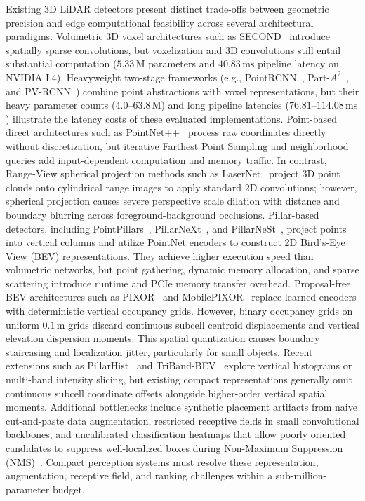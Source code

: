 Existing 3D LiDAR detectors present distinct trade-offs between geometric precision and edge computational feasibility across several architectural paradigms. Volumetric 3D voxel architectures such as SECOND~\cite{yan2018second} introduce spatially sparse convolutions, but voxelization and 3D convolutions still entail substantial computation ($5.33\,\text{M}$ parameters and $40.83\,\text{ms}$ pipeline latency on NVIDIA L4). Heavyweight two-stage frameworks (e.g., PointRCNN~\cite{shi2019pointrcnn}, Part-$A^2$~\cite{shi2020part}, and PV-RCNN~\cite{shi2020pvrcnn}) combine point abstractions with voxel representations, but their heavy parameter counts ($4.0\text{--}63.8\,\text{M}$) and long pipeline latencies ($76.81\text{--}114.08\,\text{ms}$) illustrate the latency costs of these evaluated implementations. Point-based direct architectures such as PointNet++~\cite{qi2017pointnetplusplus} process raw coordinates directly without discretization, but iterative Farthest Point Sampling and neighborhood queries add input-dependent computation and memory traffic. In contrast, Range-View spherical projection methods such as LaserNet~\cite{meyer2019lasernet} project 3D point clouds onto cylindrical range images to apply standard 2D convolutions; however, spherical projection causes severe perspective scale dilation with distance and boundary blurring across foreground-background occlusions. Pillar-based detectors, including PointPillars~\cite{lang2019pointpillars}, PillarNeXt~\cite{li2023pillarnext}, and PillarNeSt~\cite{mao2023pillarnest}, project points into vertical columns and utilize PointNet encoders to construct 2D Bird's-Eye View (BEV) representations. They achieve higher execution speed than volumetric networks, but point gathering, dynamic memory allocation, and sparse scattering introduce runtime and PCIe memory transfer overhead. Proposal-free BEV architectures such as PIXOR~\cite{yang2018pixor} and MobilePIXOR~\cite{nguyen2024indoor} replace learned encoders with deterministic vertical occupancy grids. However, binary occupancy grids on uniform $0.1\,\text{m}$ grids discard continuous subcell centroid displacements and vertical elevation dispersion moments. This spatial quantization causes boundary staircasing and localization jitter, particularly for small objects. Recent extensions such as PillarHist~\cite{zhou2025pillarhist} and TriBand-BEV~\cite{khoshkdahan2026triband} explore vertical histograms or multi-band intensity slicing, but existing compact representations generally omit continuous subcell coordinate offsets alongside higher-order vertical spatial moments. Additional bottlenecks include synthetic placement artifacts from naive cut-and-paste data augmentation, restricted receptive fields in small convolutional backbones, and uncalibrated classification heatmaps that allow poorly oriented candidates to suppress well-localized boxes during Non-Maximum Suppression (NMS)~\cite{li2020gfl}. Compact perception systems must resolve these representation, augmentation, receptive field, and ranking challenges within a sub-million-parameter budget.

